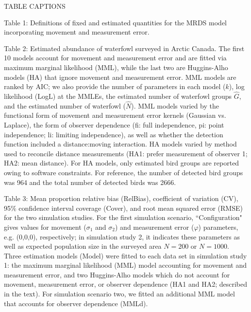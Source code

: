 \documentclass[12pt,fleqn]{article}
\begin{document}



\pagebreak
TABLE CAPTIONS

Table 1: Definitions of fixed and estimated quantities for the MRDS model incorporating movement and measurement error.

\vspace{.3cm}

Table 2: Estimated abundance of waterfowl surveyed in Arctic Canada.  The first 10 models account for movement and measurement error and are fitted via maximum marginal likelihood (MML), while the last two are Huggins-Alho models (HA) that ignore movement and measurement error.  MML models are ranked by AIC; we also provide the number of parameters in each model ($k$), log likelihood (LogL) at the MMLEs, the estimated number of waterfowl groups $\hat{G}$, and the estimated number of waterfowl ($\hat{N}$).  MML models varied by the functional form of movement and measurement error kernels (Gaussian vs. Laplace), the form of observer dependence (fi: full independence, pi: point independence; li: limiting independence),  as well as whether the detection function included a distance:moving interaction.  HA models varied by method used to reconcile distance measurements (HA1: prefer measurement of observer 1; HA2: mean distance). For HA models, only estimated bird groups are reported owing to software constraints. For reference, the number of detected bird groups was 964 and the total number of detected birds was 2666.

\vspace{.3cm}

Table 3: Mean proportion relative bias (RelBias), coefficient of variation (CV), 95\% confidence interval coverage (Cover), and root mean squared error (RMSE) for the two simulation studies. For the first simulation scenario, ``Configuration" gives values for movement ($\sigma_1$ and $\sigma_2$) and measurement error ($\varphi$) parameters, e.g. (0,0,0), respectively; in simulation study 2, it indicates these parameters as well as expected population size in the surveyed area $N=200$ or $N=1000$.  Three estimation models (Model) were fitted to each data set in simulation study 1: the maximum marginal likelihood (MML) model accounting for movement and measurement error, and two Huggins-Alho models which do not account for movement, measurement error, or observer dependence (HA1 and HA2; described in the text).  For simulation scenario two, we fitted an additional MML model that accounts for observer dependence (MMLd).
\end{document}
